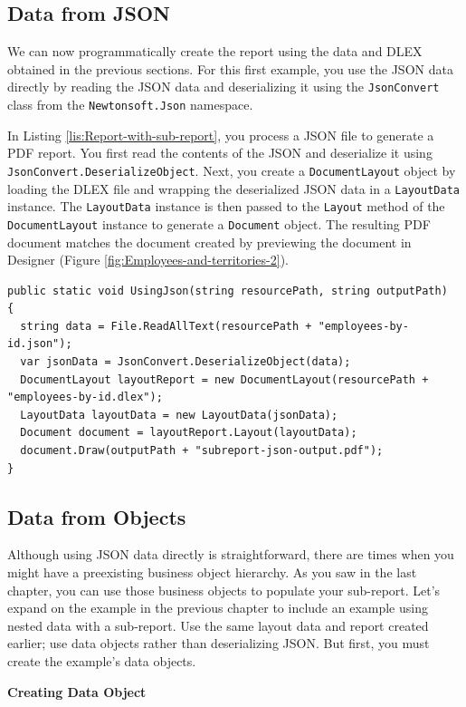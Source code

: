 \documentclass[american]{tufte-book}
\numberwithin{equation}{section}
\numberwithin{figure}{section}
\begin{document}
{{\begin{figure}
\end{figure}


\subsection{Data from JSON}

We can now programmatically create
the report using the data and DLEX obtained in the previous sections. For this first example, you use the JSON
data directly by reading the JSON data and deserializing it using
the \texttt{JsonConvert} class from the \texttt{Newtonsoft.Json} namespace.\cite{newtonsoft}

In Listing \ref{lis:Report-with-sub-report}, you process a JSON file
to generate a PDF report. You first read the contents of the JSON
and deserialize it using \texttt{JsonConvert.DeserializeObject}. Next,
you create a \texttt{DocumentLayout} object by loading the DLEX file
and wrapping the deserialized JSON data in a \texttt{LayoutData} instance.
The \texttt{LayoutData} instance is then passed to the \texttt{Layout}
method of the \texttt{DocumentLayout} instance to generate a \texttt{Document}
object. The resulting PDF document matches the document created by
previewing the document in Designer (Figure \ref{fig:Employees-and-territories-2}).

\bgroup{}
\begin{lstlisting}[caption={Report with sub-report using JSON.},label={lis:Report-with-sub-report},basicstyle={\footnotesize\ttfamily},breaklines=true]
public static void UsingJson(string resourcePath, string outputPath)
{
  string data = File.ReadAllText(resourcePath + "employees-by-id.json");
  var jsonData = JsonConvert.DeserializeObject(data);
  DocumentLayout layoutReport = new DocumentLayout(resourcePath + "employees-by-id.dlex");
  LayoutData layoutData = new LayoutData(jsonData);
  Document document = layoutReport.Layout(layoutData);
  document.Draw(outputPath + "subreport-json-output.pdf");
}
\end{lstlisting}
\leavevmode\egroup


\subsection{Data from Objects}

Although using JSON data directly is straightforward, there are times
when you might have a preexisting business object hierarchy. As you
saw in the last chapter, you can use those business objects to populate
your sub-report. Let's expand on the example in the previous chapter to include an example using nested data with a sub-report.
Use the same layout data and report created earlier; use data objects
rather than deserializing JSON. But first, you must create the example's
data objects.
\noindent\begin{flushleft}
\textbf{Creating Data Object}
\par\end{flushleft}

}}
\end{document}
